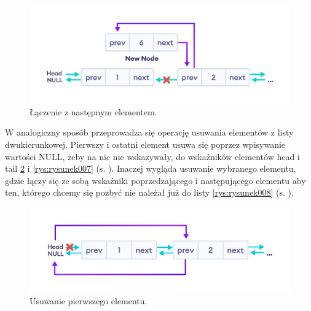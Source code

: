 \newpage

\begin{figure}[!htb]
	\begin{center}
		\includegraphics[scale=0.7]{Dokumentacja/rys/dodaj_indeks2.png}
		\caption{Łączenie z następnym elementem.}
		\label{rys:rysunek005}
	\end{center}
\end{figure}


\hspace{0.60cm}W analogiczny sposób przeprowadza się operację usuwania elementów z listy dwukierunkowej. Pierwszy i ostatni element usuwa się poprzez wpisywanie wartości NULL, żeby na nic nie wskazywały, do wskaźników elementów head i tail \ref{rys:rysunek006} i \ref{rys:rysunek007} (s. \pageref{rys:rysunek006}). Inaczej wygląda usuwanie wybranego elementu, gdzie łączy się ze sobą wskaźniki poprzedzającego i następującego elementu aby ten, którego chcemy się pozbyć nie należał już do listy \ref{rys:rysunek008} (s. \pageref{rys:rysunek008}).

\begin{figure}[!htb]
	\begin{center}
		\includegraphics[scale=0.6]{Dokumentacja/rys/usun_przod.png}
		\caption{Usuwanie pierwszego elementu.}
		\label{rys:rysunek006}
	\end{center}
\end{figure}

